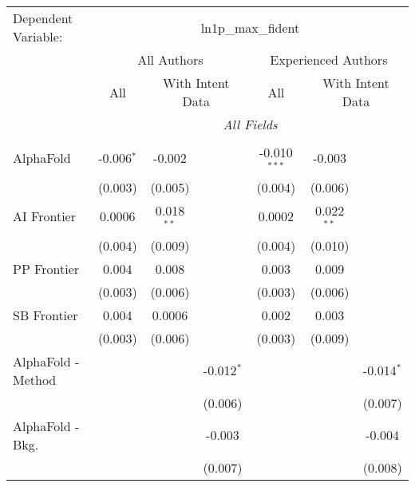 \begingroup
\centering
\begin{tabular}{lcccccc}
   \tabularnewline \midrule \midrule
   Dependent Variable: & \multicolumn{6}{c}{ln1p\_max\_fident}\\
 & \multicolumn{3}{c}{All Authors} & \multicolumn{3}{c}{Experienced Authors} \\
\cmidrule(lr){2-4} \cmidrule(lr){5-7}
 & \multicolumn{1}{c}{All} & \multicolumn{2}{c}{With Intent Data} & \multicolumn{1}{c}{All} & \multicolumn{2}{c}{With Intent Data} \\
\cmidrule(lr){2-2} \cmidrule(lr){3-4} \cmidrule(lr){5-5} \cmidrule(lr){6-7}
 & \multicolumn{6}{c}{\textit{All Fields}} \\ \\
   AlphaFold                     & -0.006$^{*}$ & -0.002       &              & -0.010$^{***}$ & -0.003       &   \\   
                                 & (0.003)      & (0.005)      &              & (0.004)        & (0.006)      &   \\   
   AI Frontier                   & 0.0006       & 0.018$^{**}$ &              & 0.0002         & 0.022$^{**}$ &   \\   
                                 & (0.004)      & (0.009)      &              & (0.004)        & (0.010)      &   \\   
   PP Frontier                   & 0.004        & 0.008        &              & 0.003          & 0.009        &   \\   
                                 & (0.003)      & (0.006)      &              & (0.003)        & (0.006)      &   \\   
   SB Frontier                   & 0.004        & 0.0006       &              & 0.002          & 0.003        &   \\   
                                 & (0.003)      & (0.006)      &              & (0.003)        & (0.009)      &   \\   
   AlphaFold - Method            &              &              & -0.012$^{*}$ &                &              & -0.014$^{*}$\\   
                                 &              &              & (0.006)      &                &              & (0.007)\\   
   AlphaFold - Bkg.              &              &              & -0.003       &                &              & -0.004\\   
                                 &              &              & (0.007)      &                &              & (0.008)\\   

\end{tabular}
